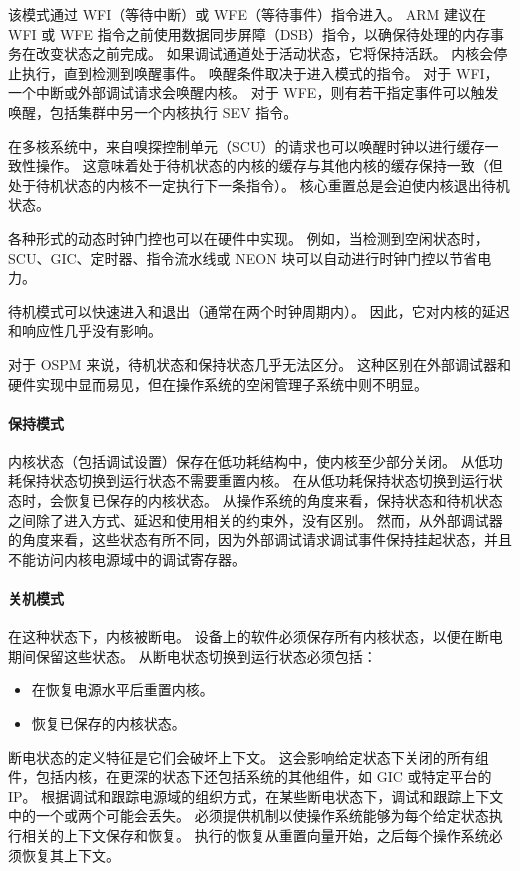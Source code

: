该模式通过 WFI（等待中断）或 WFE（等待事件）指令进入。
ARM 建议在 WFI 或 WFE 指令之前使用数据同步屏障（DSB）指令，以确保待处理的内存事务在改变状态之前完成。
如果调试通道处于活动状态，它将保持活跃。
内核会停止执行，直到检测到唤醒事件。
唤醒条件取决于进入模式的指令。
对于 WFI，一个中断或外部调试请求会唤醒内核。
对于 WFE，则有若干指定事件可以触发唤醒，包括集群中另一个内核执行 SEV 指令。

在多核系统中，来自嗅探控制单元（SCU）的请求也可以唤醒时钟以进行缓存一致性操作。
这意味着处于待机状态的内核的缓存与其他内核的缓存保持一致（但处于待机状态的内核不一定执行下一条指令）。
核心重置总是会迫使内核退出待机状态。

各种形式的动态时钟门控也可以在硬件中实现。
例如，当检测到空闲状态时，SCU、GIC、定时器、指令流水线或
NEON 块可以自动进行时钟门控以节省电力。

待机模式可以快速进入和退出（通常在两个时钟周期内）。
因此，它对内核的延迟和响应性几乎没有影响。

对于 OSPM 来说，待机状态和保持状态几乎无法区分。
这种区别在外部调试器和硬件实现中显而易见，但在操作系统的空闲管理子系统中则不明显。

\paragraph*{保持模式}

内核状态（包括调试设置）保存在低功耗结构中，使内核至少部分关闭。
从低功耗保持状态切换到运行状态不需要重置内核。
在从低功耗保持状态切换到运行状态时，会恢复已保存的内核状态。
从操作系统的角度来看，保持状态和待机状态之间除了进入方式、延迟和使用相关的约束外，没有区别。
然而，从外部调试器的角度来看，这些状态有所不同，因为外部调试请求调试事件保持挂起状态，并且不能访问内核电源域中的调试寄存器。

\paragraph*{关机模式}

在这种状态下，内核被断电。
设备上的软件必须保存所有内核状态，以便在断电期间保留这些状态。
从断电状态切换到运行状态必须包括：

\begin{itemize}
\item
  在恢复电源水平后重置内核。
\item
  恢复已保存的内核状态。
\end{itemize}

断电状态的定义特征是它们会破坏上下文。
这会影响给定状态下关闭的所有组件，包括内核，在更深的状态下还包括系统的其他组件，如 GIC 或特定平台的 IP。
根据调试和跟踪电源域的组织方式，在某些断电状态下，调试和跟踪上下文中的一个或两个可能会丢失。
必须提供机制以使操作系统能够为每个给定状态执行相关的上下文保存和恢复。
执行的恢复从重置向量开始，之后每个操作系统必须恢复其上下文。

